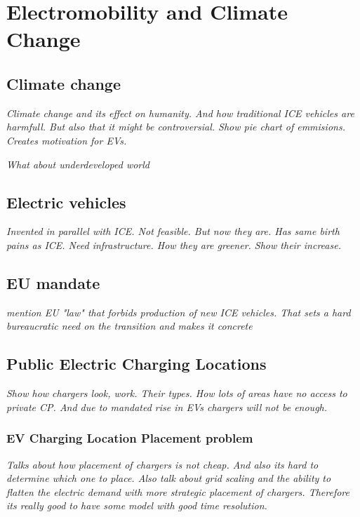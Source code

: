 
\setchapterpreamble[u]{\margintoc}
\chapter{Electromobility and Climate Change}



\section{Climate change}

\textit{Climate change and its effect on humanity. And how traditional ICE vehicles are harmfull. But also that it might be controversial. Show pie chart of emmisions. Creates motivation for EVs.}

\textit{What about underdeveloped world}

\section{Electric vehicles}

\textit{Invented in parallel with ICE. Not feasible. But now they are. Has same birth pains as ICE. Need infrastructure. How they are greener. Show their increase.}

\section{EU mandate}


\textit{mention EU "law" that forbids production of new ICE vehicles. That sets a hard bureaucratic need on the transition and makes it concrete}

\section{Public Electric Charging Locations}

\textit{Show how chargers look, work. Their types. How lots of areas have no access to private CP. And due to mandated rise in EVs chargers will not be enough.}

\subsection{EV Charging Location Placement problem}

\textit{Talks about how placement of chargers is not cheap. And also its hard to determine which one to place. Also talk about grid scaling and the ability to flatten the electric demand with more strategic placement of chargers. Therefore its really good to have some model with good time resolution.}

